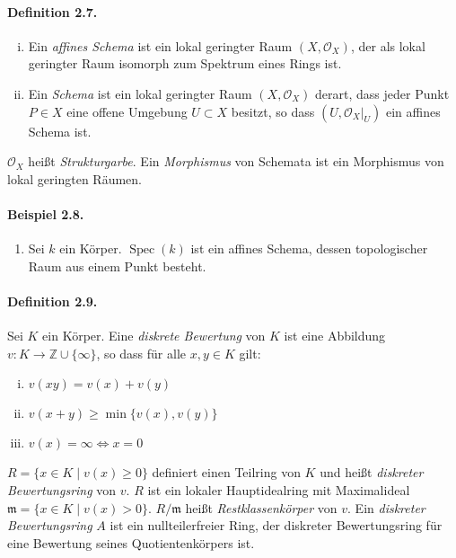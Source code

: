 \documentclass[11pt,b5paper,openany]{memoir}
\begin{document}
\paragraph{Definition 2.7.}\label{2.7} \begin{enumerate}[(i)]
\item Ein \textit{affines Schema} ist ein lokal geringter Raum $(X,\mathcal{O}_X)$, der als lokal geringter Raum isomorph zum Spektrum eines Rings ist.
\item Ein \textit{Schema} ist ein lokal geringter Raum $(X,\mathcal{O}_X)$ derart, dass jeder Punkt $P\in X$ eine offene Umgebung $U\subset X$ besitzt, so dass $(U,\mathcal{O}_X|_U)$ ein affines Schema ist.
\end{enumerate}
$\mathcal{O}_X$ heißt \textit{Strukturgarbe}. Ein \textit{Morphismus} von Schemata ist ein Morphismus von lokal geringten Räumen.

\paragraph{Beispiel 2.8.}\label{2.8}\begin{enumerate}
\item Sei $k$ ein Körper. $\operatorname{Spec}(k)$ ist ein affines Schema, dessen topologischer Raum aus einem Punkt besteht.
\end{enumerate}

\paragraph{Definition 2.9.}\label{2.9} Sei $K$ ein Körper. Eine \textit{diskrete Bewertung} von $K$ ist eine Abbildung $v:K\to\mathbb{Z}\cup\{\infty\}$, so dass für alle $x,y\in K$ gilt:
\begin{enumerate}[(i)]
\item $v(xy)=v(x)+v(y)$
\item $v(x+y)\geq \min\{v(x),v(y)\}$
\item $v(x)=\infty\iff x=0$
\end{enumerate}
$R=\{x\in K\mid v(x)\geq 0\}$ definiert einen Teilring von $K$ und heißt \textit{diskreter Be\-wer\-tungs\-ring} von $v$. $R$ ist ein lokaler Hauptidealring mit Maximalideal $\mathfrak{m}=\{x\in K\mid v(x) >0\}$. $R/\mathfrak{m}$ heißt \textit{Restklassenkörper} von $v$. Ein \textit{diskreter Bewertungsring} $A$ ist ein nullteilerfreier Ring, der diskreter Bewertungsring für eine Bewertung seines Quotientenkörpers ist.
\end{document}
